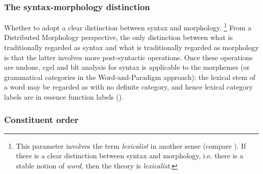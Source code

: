 \documentclass[UTF8, a4paper, oneside, scheme=plain]{ctexart}
\newcommand*{\term}[1]{\emph{#1}}
\begin{document}
\subsubsection{The syntax-morphology distinction}

Whether to adopt a clear distinction between syntax and morphology.%
\footnote{
    This parameter involves the term \term{lexicalist} in another sense (compare ).
    If there is a clear distinction between syntax and morphology,
    i.e. there is a stable notion of \term{word},
    then the theory is \term{lexicalist}.
}
From a Distributed Morphology perspective,
the only distinction between what is traditionally regarded as syntax 
and what is traditionally regarded as morphology 
is that the latter involves more post-syntactic operations.
Once these operations are undone,
\ac{cgel} and \ac{blt} analysis for syntax is applicable to the morphemes
(or grammatical categories in the Word-and-Paradigm approach):
the lexical stem of a word may be regarded as with no definite category,
and hence lexical category labels are in essence function labels ().

\subsubsection{Constituent order}
\end{document}
